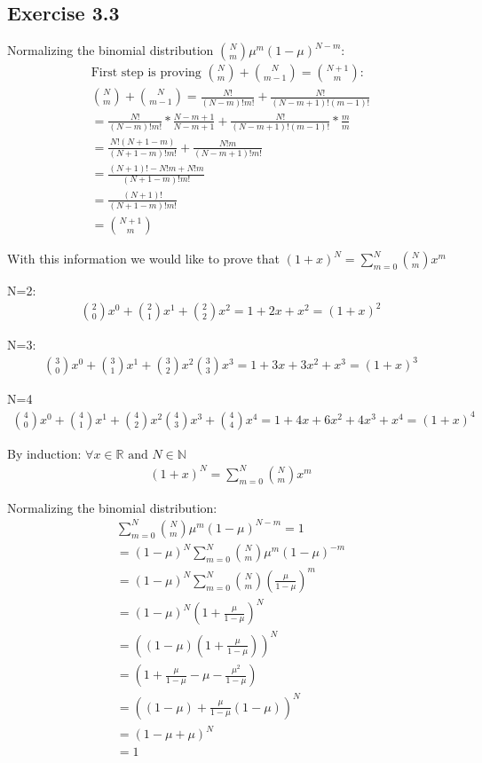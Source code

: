 \subsection{Exercise 3.3}
Normalizing the binomial distribution ${N \choose m} \mu^m (1-\mu)^{N-m}$:
\begin{gather}
  \text{First step is proving } {N \choose m} + {N \choose m-1} = {N+1 \choose m}: \\
  {N \choose m} + {N \choose m-1} = \frac{N!}{(N-m)!m!} + \frac{N!}{(N-m+1)!(m-1)!} \\
  = \frac{N!}{(N-m)!m!} * \frac{N-m+1}{N-m+1} + \frac{N!}{(N-m+1)!(m-1)!} * \frac{m}{m} \\
  = \frac{N!(N+1-m)}{(N+1-m)!m!} + \frac{N!m}{(N-m+1)!m!} \\
  = \frac{(N+1)!-N!m + N!m}{(N+1-m)!m!} \\
  = \frac{(N+1)!}{(N+1-m)!m!} \\
  = {N+1 \choose m}
\end{gather}

With this information we would like to prove that $(1+x)^N = \sum_{m=0}^{N} {N \choose m} x^m$

N=2:
\begin{gather}
  {2 \choose 0} x^0 + {2 \choose 1} x^1 +  {2 \choose 2} x^2 = 1 + 2x + x^2 = (1+x)^2
\end{gather}

N=3:
\begin{gather}
  {3 \choose 0} x^0 + {3 \choose 1} x^1 +  {3 \choose 2} x^2 {3 \choose 3} x^3 = 1 + 3x + 3x^2 + x^3 = (1+x)^3
\end{gather}

N=4
\begin{gather}
  {4 \choose 0} x^0 + {4 \choose 1} x^1 +  {4 \choose 2} x^2 {4 \choose 3} x^3 + {4 \choose 4}x^4 = 1 + 4x + 6x^2 +4x^3 + x^4= (1+x)^4
\end{gather}

By induction:
$\forall x \in \mathbb{R} \text{ and } N \in \mathbb{N}$
\begin{gather}
  (1+x)^N = \sum_{m=0}^{N} {N \choose m} x^m
\end{gather}

Normalizing the binomial distribution:
\begin{gather}
  \sum_{m=0}^{N}{N \choose m} \mu^m (1-\mu)^{N-m} = 1 \\
  = (1-\mu)^N \sum_{m=0}^{N}{N \choose m} \mu^m (1-\mu)^{-m} \\
  = (1-\mu)^N \sum_{m=0}^{N}{N \choose m} (\frac{\mu}{1-\mu})^m \\
  = (1-\mu)^N (1+\frac{\mu}{1-\mu})^N \\
  = ((1-\mu)(1+\frac{\mu}{1-\mu}))^N \\
  = (1+\frac{\mu}{1-\mu}-\mu -\frac{\mu^2}{1-\mu}) \\
  = ((1-\mu) + \frac{\mu}{1-\mu}(1-\mu))^N \\
  = (1-\mu + \mu)^N \\
  = 1
\end{gather}

